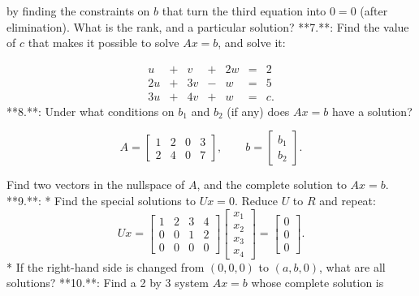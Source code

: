 by finding the constraints on \(b\) that turn the third equation into \(0=0\) (after elimination). What is the rank, and a particular solution?
**7.**: Find the value of \(c\) that makes it possible to solve \(Ax=b\), and solve it:

\[\begin{array}{cccccccl}u&+&v&+&2w&=&2\\ 2u&+&3v&-&w&=&5\\ 3u&+&4v&+&w&=&c.\end{array}\]
**8.**: Under what conditions on \(b_{1}\) and \(b_{2}\) (if any) does \(Ax=b\) have a solution?

\[A=\begin{bmatrix}1&2&0&3\\ 2&4&0&7\end{bmatrix},\qquad b=\begin{bmatrix}b_{1}\\ b_{2}\end{bmatrix}.\]

Find two vectors in the nullspace of \(A\), and the complete solution to \(Ax=b\).
**9.**:
* Find the special solutions to \(Ux=0\). Reduce \(U\) to \(R\) and repeat: \[Ux=\begin{bmatrix}1&2&3&4\\ 0&0&1&2\\ 0&0&0&0\end{bmatrix}\begin{bmatrix}x_{1}\\ x_{2}\\ x_{3}\\ x_{4}\end{bmatrix}=\begin{bmatrix}0\\ 0\\ 0\end{bmatrix}.\]
* If the right-hand side is changed from \((0,0,0)\) to \((a,b,0)\), what are all solutions?
**10.**: Find a 2 by 3 system \(Ax=b\) whose complete solution is